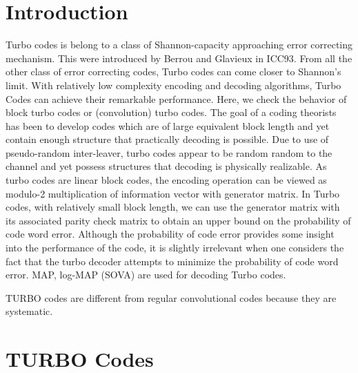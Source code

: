 \documentclass[conference,a4paper]{IEEEtran}
\begin{document}



%
\IEEEpeerreviewmaketitle

\vspace{7pt}
\section{Introduction}
Turbo codes is belong to a class of Shannon-capacity approaching error correcting mechanism. This were introduced by Berrou and Glavieux in ICC93. From all the other class of error correcting codes, Turbo codes can come closer to Shannon’s limit. With relatively low complexity encoding and decoding algorithms, Turbo Codes can achieve their remarkable performance. Here, we check the behavior of block turbo codes or (convolution) turbo codes. The goal of a coding theorists has been to develop codes which are of large equivalent block length and yet contain enough structure that practically decoding is possible. Due to use of pseudo-random inter-leaver, turbo codes appear to be random random to the channel and yet possess structures that decoding is physically realizable. As turbo codes are linear block codes, the encoding operation can be viewed as modulo-2 multiplication of information vector with generator matrix. In Turbo codes, with relatively small block length, we can use the generator matrix with its associated parity check matrix to obtain an upper bound on the probability of code word error. Although the probability of code error provides some insight into the performance of the code, it is slightly irrelevant when one considers the fact that the turbo decoder attempts to minimize the probability of code word error. MAP, log-MAP (SOVA) are used for decoding Turbo codes.

TURBO codes are different from regular convolutional codes because they are systematic. 



\vspace{7pt}
\section{TURBO Codes}
\end{document}
